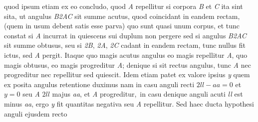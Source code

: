 \protect{}
%
quod ipsum etiam ex eo concludo, quod \textit{A} repellitur si corpora \textit{B} et \textit{C} 
%
ita sint sita, ut angulus \textit{B{\scriptsize2}AC} sit summe acutus,%
\protect{} quod 
%
%
coincidant in eandem rectam, (quem in usum debent satis esse parva) quo
%
%
 sunt quasi unum corpus, et tunc constat si \textit{A} incurrat in quiescens sui duplum non pergere sed
%
%
si angulus \textit{B{\scriptsize2}AC} sit summe obtusus,%
\protect{} seu si \textit{{\scriptsize2}B}, \textit{{\scriptsize2}A},  
%
\textit{{\scriptsize2}C} cadant in eandem rectam, tunc nullus fit ictus, sed \textit{A} pergit. Itaque quo magis acutus%
\protect{}  
%
angulus eo magis repellitur \textit{A}, quo magis obtusus,%
\protect{} eo magis progreditur \textit{A}; denique si sit rectus angulus,%
\protect{}  
%
tunc \textit{A} nec progreditur  nec repellitur sed quiescit. Idem etiam patet ex valore ipsius \textit{y} quem ex posita  
%
angulus retentione duximus nam in casu anguli recti $2ll-aa=0$ et $y=0$ seu \textit{A}
%
%
 $2ll$ majus \textit{aa}, et \textit{A} progreditur\lbrack,\rbrack\ in casu denique anguli acuti%
\protect{} \textit{ll}  
%
est minus \textit{aa}, ergo \textit{y} fit quantitas negativa seu \textit{A} repellitur. Sed haec ducta
%
%
 hypothesi anguli ejusdem
%
%
recto

